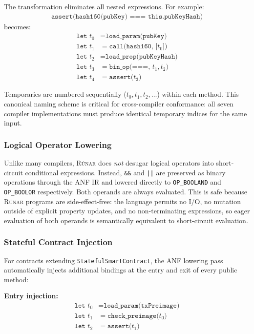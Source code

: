\documentclass[11pt,a4paper]{article}
\newcommand{\op}[1]{\texttt{OP\_#1}}
\newcommand{\runar}{\textsc{Rúnar}}
\begin{document}
The transformation eliminates all nested expressions. For example:
\begin{align*}
  \texttt{assert(hash160(pubKey) === this.pubKeyHash)}
\end{align*}
becomes:
\begin{align*}
  \texttt{let } t_0 &= \texttt{load\_param(pubKey)} \\
  \texttt{let } t_1 &= \texttt{call(hash160, [}t_0\texttt{])} \\
  \texttt{let } t_2 &= \texttt{load\_prop(pubKeyHash)} \\
  \texttt{let } t_3 &= \texttt{bin\_op(===, }t_1, t_2\texttt{)} \\
  \texttt{let } t_4 &= \texttt{assert(}t_3\texttt{)}
\end{align*}

Temporaries are numbered sequentially ($t_0, t_1, t_2, \ldots$) within each
method. This canonical naming scheme is critical for cross-compiler
conformance: all seven compiler implementations must produce identical
temporary indices for the same input.

\subsubsection{Logical Operator Lowering}

Unlike many compilers, \runar{} does \emph{not} desugar logical operators
into short-circuit conditional expressions. Instead, \texttt{\&\&} and
\texttt{||} are preserved as binary operations through the ANF IR and
lowered directly to \op{BOOLAND} and \op{BOOLOR} respectively. Both
operands are always evaluated. This is safe because \runar{} programs are
side-effect-free: the language permits no I/O, no mutation outside of
explicit property updates, and no non-terminating expressions, so eager
evaluation of both operands is semantically equivalent to short-circuit
evaluation.

\subsubsection{Stateful Contract Injection}

For contracts extending \texttt{StatefulSmartContract}, the ANF lowering
pass automatically injects additional bindings at the entry and exit of
every public method:

\textbf{Entry injection:}
\begin{align*}
  \texttt{let } t_0 &= \texttt{load\_param(txPreimage)} \\
  \texttt{let } t_1 &= \texttt{check\_preimage(}t_0\texttt{)} \\
  \texttt{let } t_2 &= \texttt{assert(}t_1\texttt{)}
\end{align*}
\end{document}
